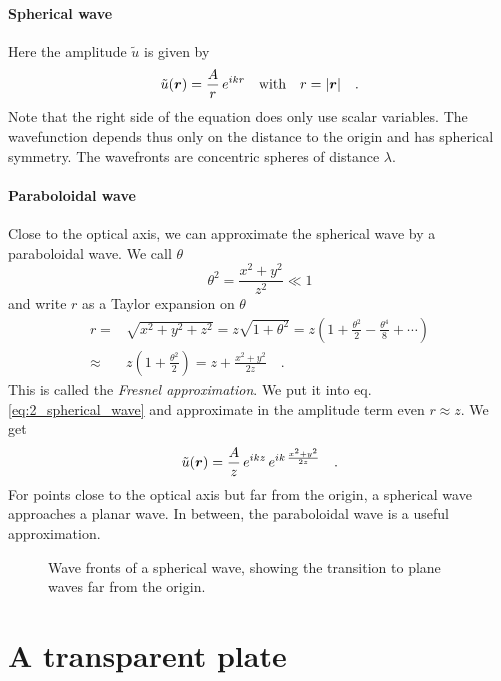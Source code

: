 \paragraph*{Spherical wave} Here the amplitude $\tilde{u}$ is given by
\begin{equation}
 \tilde{u}(\boldsymbol{r}) = \frac{A}{r} \, e^{i k r} \quad \text{with} \quad r = |\boldsymbol{r}| \quad .
 \label{eq:2_spherical_wave}
\end{equation}
Note that the right side of the equation does only use scalar variables. The wavefunction depends thus only on the distance to the origin and has spherical symmetry. The wavefronts are concentric spheres of distance $\lambda$.

\paragraph*{Paraboloidal wave} Close to the optical axis, we can approximate the spherical wave by a paraboloidal wave. We call $\theta$
\begin{equation}
    \theta^2 =  \frac{x^2 + y^2}{z^2} \ll 1
\end{equation}
and write $r$ as a Taylor expansion on $\theta$
\begin{align}
    r = & \sqrt{x^2 + y^2 + z^2}= z \sqrt{1 + \theta^2}
    = z \left( 1 + \frac{\theta^2}{2} - \frac{\theta^4}{8} + \cdots \right) \\
    \approx & z \left( 1 + \frac{\theta^2}{2} \right) = z + \frac{x^2 + y^2}{2z}  \quad .
\end{align}
This is called the \emph{Fresnel approximation}. We put it into eq.  \ref{eq:2_spherical_wave} and approximate in the amplitude term even $r \approx z$. We get
\begin{equation}
    \tilde{u}(\boldsymbol{r}) = \frac{A}{z} \, e^{i k z} \, e^{i k \, \frac{x^2 + y^2}{2z}  } \quad .
\end{equation}
For points close to the optical axis but far from the origin, a spherical wave approaches a planar wave. In between, the paraboloidal wave is a useful approximation.


\begin{figure}
   \caption{Wave fronts of a spherical wave, showing the transition to plane waves far from the origin.}
\end{figure}


\section{A transparent plate}

